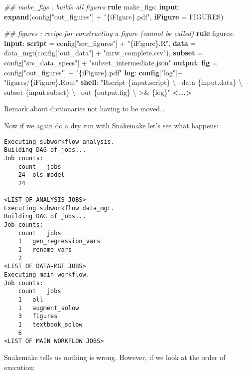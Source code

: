 \documentclass[]{book}
\newenvironment{Shaded}{\begin{snugshade}}{\end{snugshade}}
\newcommand{\KeywordTok}[1]{\textcolor[rgb]{0.13,0.29,0.53}{\textbf{{#1}}}}
\newcommand{\StringTok}[1]{\textcolor[rgb]{0.31,0.60,0.02}{{#1}}}
\newcommand{\CommentTok}[1]{\textcolor[rgb]{0.56,0.35,0.01}{\textit{{#1}}}}
\newcommand{\NormalTok}[1]{{#1}}
\theoremstyle{definition}
\theoremstyle{definition}
\theoremstyle{definition}
\theoremstyle{remark}
\begin{document}
\begin{Shaded}
\begin{Highlighting}[]
\CommentTok{## make_figs          : builds all figures}
\KeywordTok{rule} \NormalTok{make_figs:}
    \KeywordTok{input}\NormalTok{:}
        \KeywordTok{expand}\NormalTok{(config[}\StringTok{"out_figures"}\NormalTok{] + }\StringTok{"\{iFigure\}.pdf"}\NormalTok{,}
                \KeywordTok{iFigure} \NormalTok{= FIGURES)}

\CommentTok{## figures            : recipe for constructing a figure (cannot be called)}
\KeywordTok{rule} \NormalTok{figures:}
    \KeywordTok{input}\NormalTok{:}
        \KeywordTok{script} \NormalTok{= config[}\StringTok{"src_figures"}\NormalTok{] + }\StringTok{"\{iFigure\}.R"}\NormalTok{,}
        \KeywordTok{data}   \NormalTok{= data_mgt(config[}\StringTok{"out_data"}\NormalTok{] + }\StringTok{"mrw_complete.csv"}\NormalTok{),}
        \KeywordTok{subset} \NormalTok{= config[}\StringTok{"src_data_specs"}\NormalTok{] + }\StringTok{"subset_intermediate.json"}
    \KeywordTok{output}\NormalTok{:}
        \KeywordTok{fig} \NormalTok{= config[}\StringTok{"out_figures"}\NormalTok{] + }\StringTok{"\{iFigure\}.pdf"}
    \KeywordTok{log}\NormalTok{:}
        \KeywordTok{config}\NormalTok{[}\StringTok{"log"}\NormalTok{]+ }\StringTok{"figures/\{iFigure\}.Rout"}
    \KeywordTok{shell}\NormalTok{:}
        \StringTok{"Rscript \{input.script\} \textbackslash{}}
\StringTok{            --data \{input.data\} \textbackslash{}}
\StringTok{            --subset \{input.subset\} \textbackslash{}}
\StringTok{            --out \{output.fig\} \textbackslash{}}
\StringTok{            >& \{log\}"}
\KeywordTok{<...>}
\end{Highlighting}
\end{Shaded}

Remark about dictionaries not having to be moved\ldots{}

Now if we again do a dry run with Snakemake let's see what happens:

\begin{verbatim}
Executing subworkflow analysis.
Building DAG of jobs...
Job counts:
    count   jobs
    24  ols_model
    24

<LIST OF ANALYSIS JOBS>
Executing subworkflow data_mgt.
Building DAG of jobs...
Job counts:
    count   jobs
    1   gen_regression_vars
    1   rename_vars
    2
<LIST OF DATA-MGT JOBS>
Executing main workflow.
Job counts:
    count   jobs
    1   all
    1   augment_solow
    3   figures
    1   textbook_solow
    6
<LIST OF MAIN WORKFLOW JOBS>
\end{verbatim}

Snakemake tells us nothing is wrong. However, if we look at the order of
execution:
\end{document}
